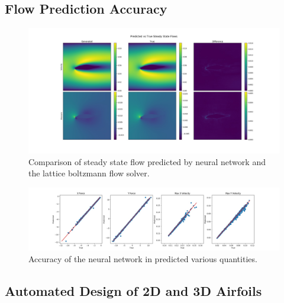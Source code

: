 \documentclass{article} %
\begin{document}
\subsection{Flow Prediction Accuracy}



\begin{figure}[!t]
\begin{center}
\includegraphics[scale=0.30]{../test/figs/generated_flow_difference.jpeg}
\end{center}
\caption{Comparison of steady state flow predicted by neural network and the lattice boltzmann flow solver.}
\label{flow_accuracy}
\end{figure}

\begin{figure}[h]
\begin{center}
\includegraphics[scale=0.30]{../test/figs/flow_accuracy_2d.jpeg}
\end{center}
\caption{Accuracy of the neural network in predicted various quantities.}
\end{figure}

\subsection{Automated Design of 2D and 3D Airfoils}
\end{document}
